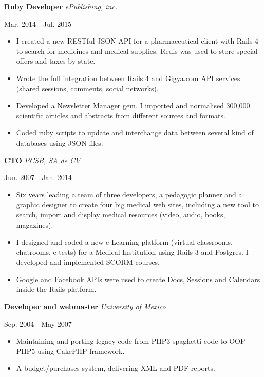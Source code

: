 \documentclass[]{k-cv}
\begin{document}
  \textbf{Ruby Developer}  \textit{ePublishing, inc.}
  {\color{gray} {\small Mar. 2014 - Jul. 2015 \par}}
   \begin{itemize}
     \item I created a new RESTful JSON API for a pharmaceutical client with Rails 4 to
           search for medicines and medical supplies. Redis was used to store
           special offers and taxes by state.
     \item Wrote the full integration between Rails 4 and Gigya.com API services (shared
           sessions, comments, social networks).
     \item Developed a Newsletter Manager gem. I imported and normalised 300,000
           scientific articles and abstracts from different sources and formats.
     \item Coded ruby scripts to update and interchange data between several kind of
           databases using JSON files.
  \end{itemize}

   \textbf{CTO} \textit{PCSB, SA de CV}
   {\color{gray} {\small Jun. 2007 - Jan. 2014 \par}}
   \begin{itemize}
     \item Six years leading a team of three developers, a pedagogic planner and a
           graphic designer to create four big medical web sites, including a new tool to
           search, import and display medical resources (video, audio, books, magazines).
     \item I designed and coded a new e-Learning platform (virtual classrooms,
           chatrooms, e-tests) for a Medical Institution using Rails 3 and Postgres. I
           developed and implemented SCORM courses.
     \item Google and Facebook APIs were used to create Docs, Sessions and Calendars
           inside the Rails platform.
   \end{itemize}

   \textbf{Developer and webmaster} \textit{University of Mexico}
   {\color{gray} {\small Sep. 2004 - May 2007 \par}}
   \begin{itemize}
     \item Maintaining and porting legacy code from PHP3 spaghetti code to OOP PHP5 using CakePHP framework.
     \item A budget/purchases system, delivering XML and PDF reports.
   \end{itemize}
\end{document}
